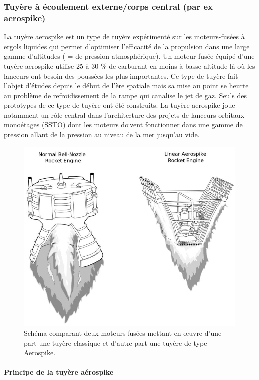 \documentclass{report}
\begin{document}
\subsubsection{Tuyère à écoulement externe/corps central (par ex aerospike)}

La tuyère aerospike est un type de tuyère expérimenté sur les moteurs-fusées à ergols liquides qui permet d'optimiser l'efficacité de la propulsion dans une large gamme d'altitudes ( = de pression atmosphérique). Un moteur-fusée équipé d'une tuyère aerospike utilise 25 à 30 $\%$ de carburant en moins à basse altitude là où les lanceurs ont besoin des poussées les plus importantes. Ce type de tuyère fait l'objet d'études depuis le début de l'ère spatiale mais sa mise au point se heurte au problème de refroidissement de la rampe qui canalise le jet de gaz. Seuls des prototypes de ce type de tuyère ont été construits. La tuyère aerospike joue notamment un rôle central dans l’architecture des projets de lanceurs orbitaux monoétages (SSTO) dont les moteurs doivent fonctionner dans une gamme de pression allant de la pression au niveau de la mer jusqu'au vide.

\begin{figure}[h!]
    \centering
    \includegraphics[scale=0.4]{50.JPG}
    \caption{Schéma comparant deux moteurs-fusées mettant en œuvre d'une part une tuyère classique et d'autre part une tuyère de type Aerospike.}
    \label{50}
\end{figure}

\paragraph{Principe de la tuyère aérospike}\\
\end{document}
